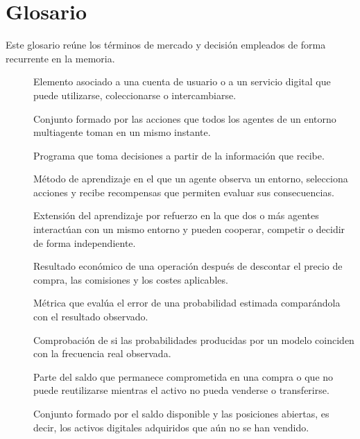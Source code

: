 \chapter*{Glosario}
\indicetoprule

Este glosario reúne los términos de mercado y decisión empleados de forma recurrente en la memoria.
\begin{description}
  \item[] Elemento asociado a una cuenta de usuario o a un servicio digital que puede utilizarse, coleccionarse o intercambiarse.
  \item[] Conjunto formado por las acciones que todos los agentes de un entorno multiagente toman en un mismo instante.
  \item[] Programa que toma decisiones a partir de la información que recibe.
  \item[] Método de aprendizaje en el que un agente observa un entorno, selecciona acciones y recibe recompensas que permiten evaluar sus consecuencias.
  \item[] Extensión del aprendizaje por refuerzo en la que dos o más agentes interactúan con un mismo entorno y pueden cooperar, competir o decidir de forma independiente.
  \item[] Resultado económico de una operación después de descontar el precio de compra, las comisiones y los costes aplicables.
  \item[] Métrica que evalúa el error de una probabilidad estimada comparándola con el resultado observado.
  \item[] Comprobación de si las probabilidades producidas por un modelo coinciden con la frecuencia real observada.
  \item[] Parte del saldo que permanece comprometida en una compra o que no puede reutilizarse mientras el activo no pueda venderse o transferirse.
  \item[] Conjunto formado por el saldo disponible y las posiciones abiertas, es decir, los activos digitales adquiridos que aún no se han vendido.

\end{description}
